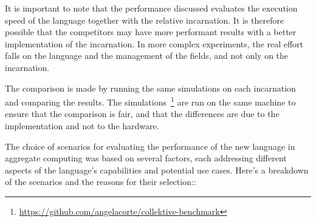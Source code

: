 It is important to note that the performance discussed evaluates the execution speed of the language together with
the relative incarnation.
It is therefore possible that the competitors may have more performant results with a better implementation of the incarnation.
In more complex experiments, the real effort falls on the language and the management of the fields, and not only on the incarnation.

The comparison is made by running the same simulations on each incarnation and comparing the results.
The simulations~\footnote{\url{https://github.com/angelacorte/collektive-benchmark}} are run on the same machine to
ensure that the comparison is fair, and that the differences are due to the implementation and not to the hardware.

The choice of scenarios for evaluating the performance of the new language in aggregate computing was based on several
factors, each addressing different aspects of the language's capabilities and potential use cases.
Here's a breakdown of the scenarios and the reasons for their selection::
